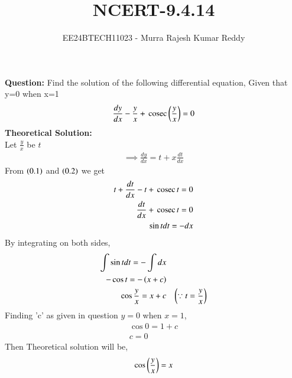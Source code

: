 \documentclass[journal]{IEEEtran}
\begin{document}

\vspace{3cm}

\title{NCERT-9.4.14}
\author{EE24BTECH11023 - Murra Rajesh Kumar Reddy}

{\let\newpage\relax\maketitle}

\renewcommand{\thefigure}{\theenumi}
\renewcommand{\thetable}{\theenumi}
\setlength{\intextsep}{10pt} %


\renewcommand{\thetable}{\theenumi}
\textbf{Question:}
 Find the solution of the following differential equation, Given that y=0 when x=1
 \begin{align}
 \frac{dy}{dx} - \frac{y}{x} + \,\text{cosec}\,{\left(\frac{y}{x}\right)} = 0
 \end{align}
 \textbf{Theoretical Solution:} \\
	 Let $\frac{y}{x}$ be $t$ \\
	 \begin{align}
		\implies \frac{dy}{dx} = t+x\frac{dt}{dx}
	 \end{align}
	 From $\left(0.1\right)$ and $\left(0.2\right)$ we get
	 \begin{align}
		 t+\frac{dt}{dx}-t+\,\text{cosec}\,{t} = 0 \\
		 \frac{dt}{dx}+\,\text{cosec}\,{t}=0 \\
		 \sin{t}dt=-dx \\
	 \end{align}
	 By integrating on both sides,
	 \begin{align}
		 \int{\sin{t}}dt=-\int dx\\
		 -\cos{t}=-\left(x+c\right)\\
		 \cos{\frac{y}{x}}=x+c  && \left(\because t =\frac{y}{x} \right)
	 \end{align}
	 Finding 'c' as given in question $y=0$ when $x=1$,
	 \begin{align}
		 \cos{0}=1+c \\
		 c=0
	 \end{align}
	 Then Theoretical solution will be,
	 \begin{align}
		 \cos{\ensuremath{\left(\frac{y}{x}\right)}}=x
	 \end{align}
\end{document}
